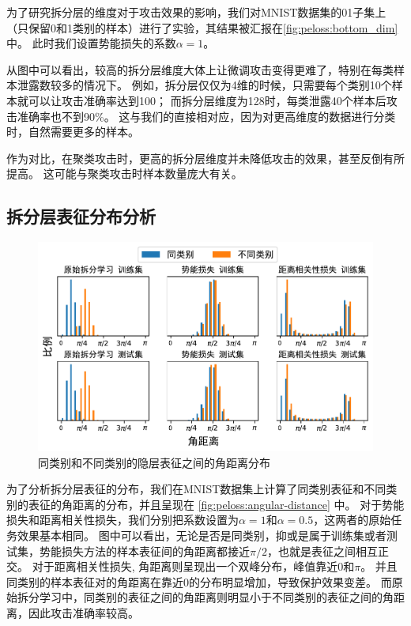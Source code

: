 为了研究拆分层的维度对于攻击效果的影响，我们对MNIST数据集的01子集上（只保留0和1类别的样本）进行了实验，其结果被汇报在\autoref{fig:peloss:bottom_dim}中。
此时我们设置势能损失的系数$\alpha=1$。

从图中可以看出，较高的拆分层维度大体上让微调攻击变得更难了，特别在每类样本泄露数较多的情况下。
%
例如，拆分层仅仅为4维的时候，只需要每个类别10个样本就可以让攻击准确率达到100；
而拆分层维度为128时，每类泄露40个样本后攻击准确率也不到90\%。
这与我们的直接相对应，因为对更高维度的数据进行分类时，自然需要更多的样本。

作为对比，在聚类攻击时，更高的拆分层维度并未降低攻击的效果，甚至反倒有所提高。
这可能与聚类攻击时样本数量庞大有关。

\subsection{拆分层表征分布分析}
\begin{figure}[h!]
    \centering
    \includegraphics[width=0.8\linewidth]{Z_Resources/peloss_angular-distance}
    \caption{同类别和不同类别的隐层表征之间的角距离分布}
    \label{fig:peloss:angular-distance}
\end{figure}


为了分析拆分层表征的分布，我们在MNIST数据集上计算了同类别表征和不同类别的表征的角距离的分布，并且呈现在 \autoref{fig:peloss:angular-distance} 中。
%
对于势能损失和距离相关性损失，我们分别把系数设置为$\alpha=1$和$\alpha=0.5$，这两者的原始任务效果基本相同。
%
图中可以看出，无论是否是同类别，抑或是属于训练集或者测试集，势能损失方法的样本表征间的角距离都接近$\pi/2$，也就是表征之间相互正交。
%
对于距离相关性损失, 角距离则呈现出一个双峰分布，峰值靠近$0$和$\pi$。
并且同类别的样本表征对的角距离在靠近0的分布明显增加，导致保护效果变差。
%
而原始拆分学习中，同类别的表征之间的角距离则明显小于不同类别的表征之间的角距离，因此攻击准确率较高。

